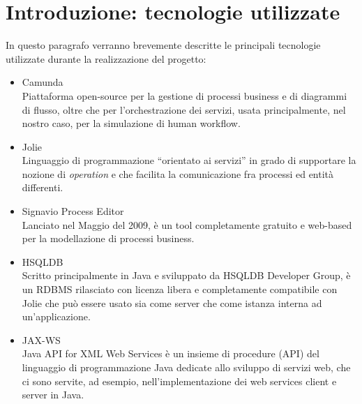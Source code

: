 \documentclass[twoside]{article}
\begin{document}
\section{Introduzione: tecnologie utilizzate}
In questo paragrafo verranno brevemente descritte le principali tecnologie utilizzate
durante la realizzazione del progetto:
\begin{itemize}
	\item Camunda \\
		  Piattaforma open-source per la gestione di processi business e di diagrammi di flusso,
		  oltre che per l'orchestrazione dei servizi,
		  usata principalmente, nel nostro caso, per la simulazione di human workflow.
	\item Jolie \\
		  Linguaggio di programmazione ``orientato ai servizi'' in grado di supportare la nozione
		  di \textit{operation} e che facilita la comunicazione fra processi ed entità differenti.
	\item Signavio Process Editor \\
		  Lanciato nel Maggio del 2009, è un tool completamente gratuito e web-based per la
		  modellazione di processi business.
	\item HSQLDB \\
		  Scritto principalmente in Java e sviluppato da HSQLDB Developer Group, è un RDBMS
		  rilasciato con licenza libera e completamente compatibile con Jolie che può essere
		  usato sia come server che come istanza interna ad un'applicazione.
	\item JAX-WS \\
		  Java API for XML Web Services è un insieme di procedure (API) del linguaggio di programmazione
		  Java dedicate allo sviluppo di servizi web, che ci sono servite, ad esempio, nell'implementazione
		  dei web services client e server in Java.
\end{itemize}
\end{document}
